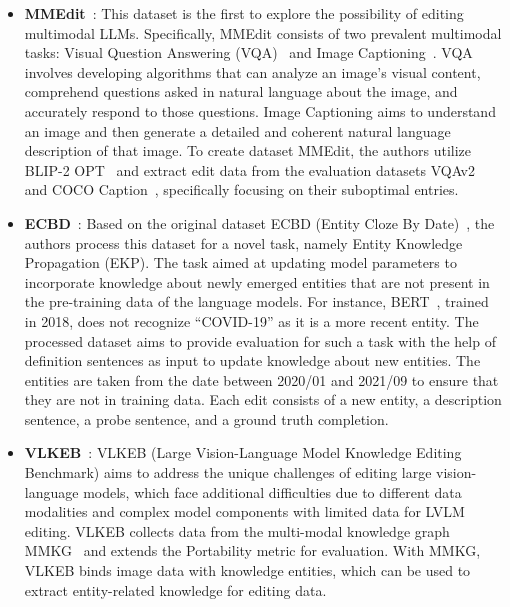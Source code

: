 \documentclass[acmsmall, screen]{acmart}
\begin{document}
\begin{itemize}[leftmargin=0.35cm]
\item\textbf{MMEdit}~\cite{cheng2023can}: This dataset is the first to explore the possibility of editing multimodal LLMs. Specifically, MMEdit consists of two prevalent multimodal tasks: Visual Question Answering (VQA)~\cite{antol2015vqa} and Image Captioning~\cite{herdade2019image}. VQA involves developing algorithms that can analyze an image's visual content, comprehend questions asked in natural language about the image, and accurately respond to those questions. Image Captioning aims to understand an image and then generate a detailed and coherent natural language description of that image. To create dataset MMEdit, the authors utilize BLIP-2 OPT~\cite{li2023blip} and extract edit data from the evaluation datasets VQAv2~\cite{goyal2017making} and COCO Caption~\cite{chen2015microsoft}, specifically focusing on their suboptimal entries.

\item\textbf{ECBD}~\cite{EKP}: Based on the original dataset ECBD (Entity Cloze By Date)~\cite{onoe2022entity}, the authors process this dataset for a novel task, namely Entity Knowledge Propagation (EKP). The task aimed at updating model parameters to incorporate knowledge about newly emerged entities that are not present in the pre-training data of the language models. For instance, BERT~\cite{devlin2018bert}, trained in 2018, does not recognize ``COVID-19'' as it is a more recent entity. The processed dataset aims to provide evaluation for such a task with the help of definition sentences as input to update knowledge about new entities. The entities are taken from the date between 2020/01 and 2021/09 to ensure that they are not in training data. Each edit consists of a new entity, a description sentence, a probe sentence, and a ground truth completion. 

\item\textbf{VLKEB}~\cite{huang2024kebench}: {VLKEB (Large Vision-Language Model Knowledge Editing Benchmark) aims to address the unique challenges of editing large vision-language models, which face additional difficulties due to different data modalities and complex model components with limited data for LVLM editing. 
VLKEB collects data from the multi-modal knowledge graph MMKG~\cite{liu2019mmkg} and extends the Portability metric for evaluation. With MMKG, VLKEB binds image data with knowledge entities, which can be used to extract entity-related knowledge for editing data. }


\end{itemize}
\end{document}
